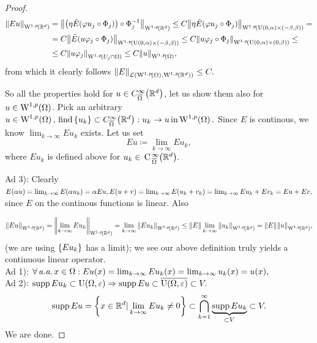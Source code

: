 \documentclass{article}
\begin{document}
\begin{proof}
\begin{align*}
\norm{Eu}_{\WkpSet[1][p]{\R^{d}}} &= \norm{\qty(\eta \tilde{E}\qty(\varphi u_j \circ \Phi_j))\circ \Phi_j^{-1}}_{\WkpSet[1][p]{\R^{d}}} \leq C\norm{\eta \tilde{E} \qty(\varphi u_j \circ \Phi_j)}_{\WkpSet[1][p]{\text{U}(0,\alpha)\times (-\beta,\beta)}} = \\
				  &= C \norm{\tilde{E}\qty(u \varphi_j \circ \Phi_j)}_{\WkpSet[1][p]{\text{U}(0,\alpha)\times (-\beta, \beta)}} \leq C \norm{u \varphi_j \circ \Phi_j}_{\WkpSet[1][p]{\text{U}(0,\alpha)\times (0,\beta)}} \leq \\
				  &\leq C \norm{u \varphi_j}_{\WkpSet[1][p]{U_j \cap \Omega}} \leq C \norm{u}_{\WkpSet[1][p]{\Omega}},
\end{align*}
from which it clearly follows $\norm{E}_{\mathcal{L}\qty(\WkpSet[1][p]{\Omega}, \WkpSet[1][p]{\R^d})} \leq C.$

	So all the properties hold for $u \in C^{\infty}_{\overline{\Omega}}\qty({\mathbb R}^d)$, let us show them also for $u \in \WkpSet[1][p]{\Omega}$.
	Pick an arbitrary $u \in \WkpSet[1][p]{\Omega}, \, \text{find} \, \{u_k\} \subset C^{\infty}_{\overline{\Omega}}\qty(\R^d): u_k \to u \, \text{in} \, \WkpSet[1][p]{\Omega}.$ Since $E$ is continous, we know $\lim_{k\to \infty}E u_k$ exists. Let us set
	\[
		E u \coloneq \lim_{k\to \infty}E u_k,
	\]
	where $Eu_k$ is defined above for $u_k \in \, \text{C} \,^{\infty}_{\overline{\Omega}}\qty({\mathbb R}^{d}).$

	Ad 3): Clearly $E \qty(\alpha u) = \lim_{k \to \infty}E \qty(\alpha u_k) = \alpha E u, E \qty(u + v) = \lim_{k\to \infty}E\qty(u_k + v_k) = \lim_{k \to \infty}Eu_k + Ev_k = Eu + Ev,$ since $E$ on the continous functions is linear. Also


	\[
		\norm{Eu}_{\WkpSet[1][p]{\R^{d}}} = \norm{\lim_{k\to \infty}E u_k}_{\WkpSet[1][p]{\R^{d}}} = \lim_{k\to \infty} \norm{E u_k}_{\WkpSet[1][p]{\R^{d}}} \leq \norm{E} \lim_{k\to \infty}\norm{u_k}_{\WkpSet[1][p]{\R^{d}}} = \norm{E} \norm{u}_{\WkpSet[1][p]{\R^{d}}},
	\]
	(we are using $\qty{E u_k}$ has a limit); we see our above definition truly yields a continuous linear operator.\\
	Ad 1): $\forall \, \text{\textit{a.a.}} \, x \in \Omega: Eu(x) = \lim_{k\to \infty}Eu_k(x) = \lim_{k \to \infty}u_k(x) = u(x),$\\
	Ad 2): $\operatorname{supp} Eu_k \subset \text{U}(\Omega,\varepsilon) \Rightarrow \operatorname{supp} Eu \subset \overline{\text{U}(\Omega,\varepsilon)} \subset V.$
	\[
		\operatorname{supp} Eu = \qty{x \in \ensuremath{{\mathbb R}}^{d}| \lim_{k\to \infty}Eu_k \neq 0}\subset \bigcap_{k=1}^{\infty}\underbrace{\operatorname{supp} Eu_k}_{\subset V} \subset V.
	\]
	We are done.

\end{proof}
\end{document}
